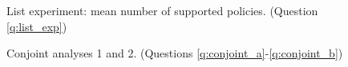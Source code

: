 \begin{figure}[h!]
    \caption[List experiment]{List experiment: mean number of supported policies. (Question \ref{q:list_exp})}\label{fig:list_exp}
\end{figure}

\begin{figure}[h!]
    \caption[Conjoint analyses 1 and 2]{Conjoint analyses 1 and 2. (Questions \ref{q:conjoint_a}-\ref{q:conjoint_b})}\label{fig:conjoint}
\end{figure}



